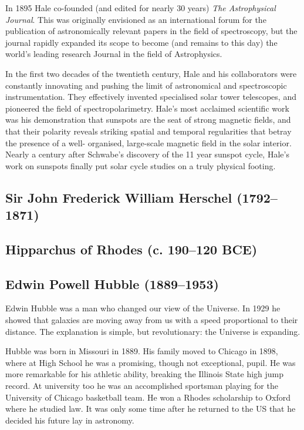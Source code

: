 In 1895 Hale co-founded (and edited for nearly 30 years) \textit{The Astrophysical Journal}. This was originally envisioned as an international forum for the publication of astronomically relevant papers in the field of spectroscopy, but the journal rapidly expanded its scope to become (and remains to this day) the world's leading research Journal in the field of Astrophysics.

In the first two decades of the twentieth century, Hale and his collaborators were constantly innovating and pushing the limit of astronomical and spectroscopic instrumentation. They effectively invented specialised solar tower telescopes, and pioneered the field of spectropolarimetry. Hale's most acclaimed scientific work was his demonstration that sunspots are the seat of strong magnetic fields, and that their polarity reveals striking spatial and temporal regularities that betray the presence of a well- organised, large-scale magnetic field in the solar interior. Nearly a century after Schwabe's discovery of the 11 year sunspot cycle, Hale's work on sunspots finally put solar cycle studies on a truly physical footing.

\subsection[Sir John \scshape{Herschel}]{Sir John Frederick William Herschel (1792--1871)}\label{bio:herschel}

\subsection[Hipparchus of Rhodes]{Hipparchus of Rhodes (c. 190--120 BCE)}\label{bio:hipparcus}

\subsection[Edwin \scshape{Hubble}]{Edwin Powell Hubble (1889--1953)}\label{bio:hubble}
Edwin Hubble was a man who changed our view of the Universe. In 1929 he showed that galaxies are moving away from us with a speed proportional to their distance. The explanation is simple, but revolutionary: the Universe is expanding.

Hubble was born in Missouri in 1889. His family moved to Chicago in 1898, where at High School he was a promising, though not exceptional, pupil. He was more remarkable for his athletic ability, breaking the Illinois State high jump record. At university too he was an accomplished sportsman playing for the University of Chicago basketball team. He won a Rhodes scholarship to Oxford where he studied law. It was only some time after he returned to the US that he decided his future lay in astronomy.

